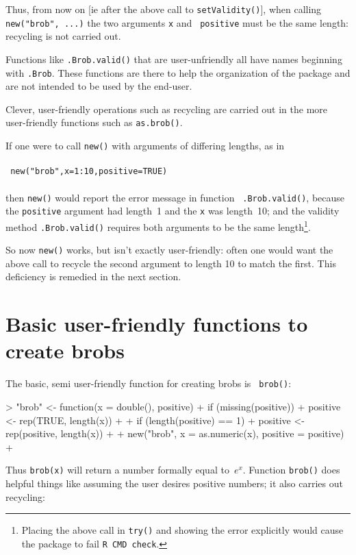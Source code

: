 \documentclass[a4paper]{article}
\begin{document}
Thus, from now on [ie after the above call to {\tt setValidity()}],
when calling {\tt new("brob", ...)} the two arguments {\tt x} and {\tt
positive} must be the same length: recycling is not carried out.

Functions like {\tt .Brob.valid()} that are user-unfriendly all have
names beginning with {\tt .Brob}.  These functions are there to help
the organization of the package and are not intended to be used by the
end-user.

Clever, user-friendly operations such as recycling are carried out in
the more user-friendly functions such as {\tt as.brob()}.

If one were to call {\tt new()} with arguments of differing lengths,
as in
\\
\\
{\tt 
new("brob",x=1:10,positive=TRUE)
}
\\
\\
then {\tt new()} would report the error message in function {\tt
  .Brob.valid()}, because the {\tt positive} argument had length~1 and
the {\tt x} was length~10; and the validity method {\tt .Brob.valid()}
requires both arguments to be the same length\footnote{Placing the
  above call in {\tt try()} and showing the error explicitly would
  cause the package to fail {\tt R CMD check}.}.

So now {\tt new()} works, but isn't exactly user-friendly: often one
would want the above call to recycle the second argument to length 10
to match the first.  This deficiency is remedied in the next section.

\section{Basic user-friendly functions to create brobs}

The basic, semi user-friendly function for creating brobs is {\tt
brob()}:

\begin{Schunk}
\begin{Sinput}
> "brob" <- function(x = double(), positive) {
+     if (missing(positive)) {
+         positive <- rep(TRUE, length(x))
+     }
+     if (length(positive) == 1) {
+         positive <- rep(positive, length(x))
+     }
+     new("brob", x = as.numeric(x), positive = positive)
+ }
\end{Sinput}
\end{Schunk}

Thus {\tt brob(x)} will return a number formally equal to~$e^x$.
Function {\tt brob()} does helpful things like assuming the user
desires positive numbers; it also carries out recycling:
\end{document}
